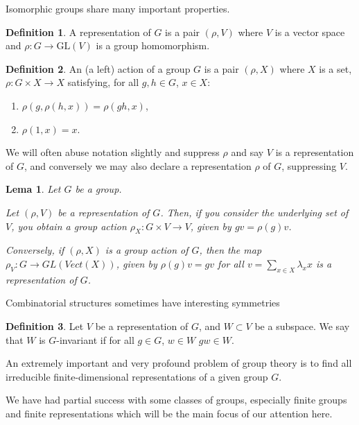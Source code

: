 \documentclass[]{article}
\newtheorem{lemma}{Lema}[section]
\theoremstyle{definition}
\newtheorem{definition}{Definition}[section]
\theoremstyle{definition}
\newcommand{\raw}{\rightarrow}
\begin{document}
	Isomorphic groups share many important properties.
	
	\begin{definition}
		A representation of $G$ is a pair $(\rho, V)$ where $V$ is a vector space and $\rho: G \raw \text{GL}(V)$ is a group homomorphism.
	\end{definition}
	
	\begin{definition}
		An (a left) action of a group $G$ is a pair $(\rho, X)$ where $X$ is a set, $\rho: G \times X \raw X$ satisfying, for all $g, h \in G$, $x \in X$:
		
		\begin{enumerate}
			\item $\rho(g,\rho(h,x)) = \rho(gh, x)$,
			
			\item $\rho(1, x) = x$. 
		\end{enumerate}
	\end{definition}
	
	We will often abuse notation slightly and suppress $\rho$ and say $V$ is a representation of $G$, and conversely we may also declare a representation $\rho$ of $G$, suppressing $V$.
	
	\begin{lemma}
		Let $G$ be a group.
		
		Let $(\rho, V)$ be a representation of $G$. Then, if you consider the underlying  set of $V$, you obtain a group action $\rho_X: G \times V \raw V$, given by $gv = \rho(g)v$.
		
		Conversely, if $(\rho, X)$ is a group action of $G$, then the map $\rho_V: G \raw GL(Vect(X))$, given by $\rho(g)v = gv$ for all $v=\sum_{x \in X}\lambda_xx$ is a representation of $G$.  
	\end{lemma}
	
	Combinatorial structures sometimes have interesting symmetries
	
	\begin{definition}
		Let $V$ be a representation of $G$, and $W \subset V$ be a subspace. We say that $W$ is $G$-invariant if for all $g \in G$, $w \in W$ $gw \in W$. 
	\end{definition}
	
	An extremely important and very profound problem of group theory is to find all irreducible finite-dimensional representations of a given group $G$.
	
	We have had partial success with some classes of groups, especially finite groups and finite representations which will be the main focus of our attention here.
	
\end{document}
